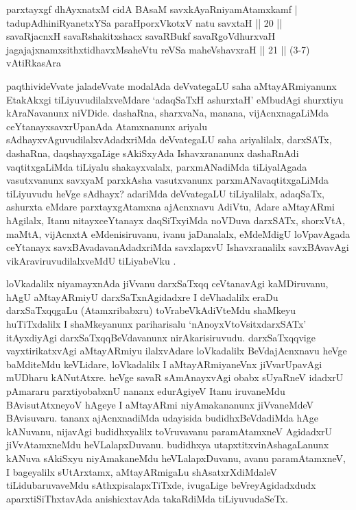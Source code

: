 \begin{shl}
parxtayxgf dhAyxnatxM cidA BAsaM savxkAyaRniyamAtamxkamf |\\
tadupAdhiniRyanetxYSa paraHporxVkotxV natu savxtaH || 20 ||\\
savaRjacnxH savaRshakitxshacx savaRBukf savaRgoVdhurxvaH\\
jagajajxnamxsithxtidhavxMsaheVtu reVSa maheVshavxraH || 21 || (3-7) vAtiRkasAra
\end{shl}

\begin{artha}
paqthivideVvate jaladeVvate modalAda deVvategaLU saha aMtayARmiyanunx EtakAkxgi tiLiyuvudilalxveMdare `adaqSaTxH ashurxtaH' eMbudAgi shurxtiyu kAraNavanunx niVDide. dashaRna, sharxvaNa, manana, vijAcnxnagaLiMda ceYtanayxsavxrUpanAda Atamxnanunx ariyalu sAdhayxvAguvudilalxvAdadxriMda deVvategaLU saha ariyalilalx, darxSATx, dashaRna, daqshayxgaLige sAkiSxyAda Ishavxrananunx dashaRnAdi vaqtitxgaLiMda tiLiyalu shakayxvalalx, parxmANadiMda tiLiyalAgada vasutxvanunx savxyaM parxkAsha vasutxvanunx parxmANavaqtitxgaLiMda tiLiyuvudu heVge sAdhayx? adariMda deVvategaLU tiLiyalilalx, adaqSaTx, ashurxta eMdare parxtayxgAtamxna ajAcnxnavu AdiVtu, Adare aMtayARmi hAgilalx, Itanu nitayxceYtanayx daqSiTxyiMda noVDuva darxSATx, shorxVtA, maMtA, vijAcnxtA eMdenisiruvanu, ivanu jaDanalalx, eMdeMdigU loVpavAgada ceYtanayx savxBAvadavanAdadxriMda savxlapxvU Ishavxranalilx savxBAvavAgi vikAraviruvudilalxveMdU tiLiyabeVku .
\end{artha}

\begin{artha}
loVkadalilx niyamayxnAda jiVvanu darxSaTxqq ceVtanavAgi kaMDiruvanu, hAgU aMtayARmiyU darxSaTxnAgidadxre I deVhadalilx eraDu darxSaTxqqgaLu (Atamxribabxru) toVrabeVkAdiVteMdu shaMkeyu huTiTxdalilx I shaMkeyanunx pariharisalu `nAnoyxV\s toV\s sitxdarxSATx' itAyxdiyAgi darxSaTxqqBeVdavanunx nirAkarisiruvudu. darxSaTxqqvige vayxtirikatxvAgi aMtayARmiyu ilalxvAdare loVkadalilx BeVdajAcnxnavu heVge baMditeMdu keVLidare, loVkadalilx I aMtayARmiyaneVnx jiVvarUpavAgi mUDharu kANutAtxre. heVge savaR sAmAnayxvAgi obabx sUyaRneV idadxrU pAmararu parxtiyobabxnU nananx edurAgiyeV Itanu iruvaneMdu BAvisutAtxneyoV hAgeye I aMtayARmi niyAmakananunx jiVvaneMdeV BAvisuvaru. tananx ajAcnxnadiMda udayisida budidhxBeVdadiMda hAge kANuvanu, nijavAgi budidhxyalilx toVruvavanu paramAtamxneV AgidadxrU jiVvAtamxneMdu heVLalapxDuvanu. budidhxya utapxtitxvinAshagaLanunx kANuva sAkiSxyu niyAmakaneMdu heVLalapxDuvanu, avanu paramAtamxneV, I bageyalilx sUtArxtamx, aMtayARmigaLu shAsatxrXdiMdaleV tiLidubaruvaveMdu sAthxpisalapxTiTxde, ivugaLige beVreyAgidadxdudx aparxtiSiThxtavAda anishicxtavAda takaRdiMda tiLiyuvudaSeTx.
\end{artha}

